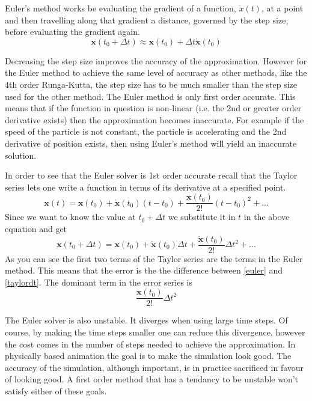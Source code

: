 Euler's method works be evaluating the gradient of a function, $\dot{x}(t)$, at
a point and then travelling along that gradient a distance, governed by the step
size, before evaluating the gradient again.
\begin{equation}
\label{euler}
	\mathbf{x}(t_0+\Delta t) \approx \mathbf{x}(t_0) + 
		\Delta{t}\mathbf{\dot{x}}(t_0)
\end{equation}


Decreasing the step size improves the accuracy of the approximation. However for
the Euler method to achieve the same level of accuracy as other methods, like
the 4th order Runga-Kutta, the step size has to be much smaller than the step
size used for the other method. The Euler method is only first order accurate.
This means that if the function in question is non-linear (i.e. the 2nd or
greater order derivative exists) then the approximation becomes inaccurate. For
example if the speed of the particle is not constant, the particle is
accelerating and the 2nd derivative of position exists, then using Euler's method
will yield an inaccurate solution.  
    
In order to see that the Euler solver is 1st order accurate recall that the
Taylor series lets one write a function in terms of its derivative at a
specified point.
\begin{equation}
	\label{taylor}
	\mathbf{x}(t) = \mathbf{x}(t_0) + \mathbf{\dot{x}}(t_0)(t - t_0) +
		\frac{\mathbf{\ddot{x}}(t_0)}{2!}(t - t_0)^2 + . . .
\end{equation}
Since we want to know the value at $t_0+\Delta t$ we substitute it in
$t$ in the above equation and get
\begin{equation}
	\label{taylordt}
	\mathbf{x}(t_0 + \Delta t) = \mathbf{x}(t_0) + 
		\mathbf{\dot{x}}(t_0)\Delta t + 
		\frac{\mathbf{\ddot{x}}(t_0)}{2!}\Delta t^2 + . . .
\end{equation}
As you can see the first two terms of the Taylor series are the terms in the
Euler method. This means that the error is the the difference between
\ref{euler} and \ref{taylordt}. The dominant term in the error series is  
\[
    \frac{\mathbf{\ddot{x}}(t_0)}{2!}\Delta t^2
\]

The Euler solver is also unstable. It diverges when using large time steps. Of
course, by making the time steps smaller one can reduce this divergence, however
the cost comes in the number of steps needed to achieve the approximation. In
physically based animation the goal is to make the simulation look good. The
accuracy of the simulation, although important, is in practice sacrificed in
favour of looking good. A first order method that has a tendancy to be unstable
won't satisfy either of these goals.


